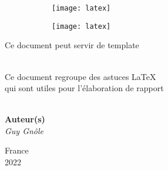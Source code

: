 \documentclass[../main.tex]{subfiles}
\begin{document}
\thispagestyle{empty}

\begin{center}

	\begin{figure}[h]
		\begin{subfigure}{0.5\textwidth}
			\texttt{[image: latex]} 
		\end{subfigure}
		\begin{subfigure}{0.5\textwidth}
			\texttt{[image: latex]}
		\end{subfigure}
	\end{figure}

    \vspace{5cm}
            
    \Huge
    \textbf{\customTitle}
            
    \vspace{0.5cm}
    \Large
    Ce document peut servir de template
            
    \vfill
    
    \hrulefill\\
    Ce document regroupe des astuces \LaTeX\\
    qui sont utiles pour l'élaboration de rapport\\
    \hrulefill\\
    
   	\vspace{3.5cm}
            
    \textbf{Auteur(s)}\\
    \textit{Guy Gn\^{o}le}

    \vspace{1.5cm}
            
    \Large
    France\\
    2022
        
\end{center}

\newpage
\end{document}
